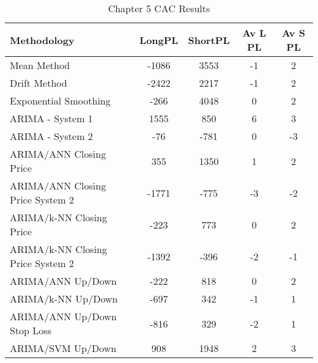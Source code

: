 \begin{table}[ht]
\centering
\caption[Chapter 5 CAC Results]{Chapter 5 CAC Results} 
\label{tab:chp6:cac2_summary}
\begin{tabular}{lcccc}
  \toprule Methodology & LongPL & ShortPL & Av L PL & Av S PL \\ 
  \midrule Mean Method & -1086 & 3553 & -1 & 2 \\ 
  Drift Method & -2422 & 2217 & -1 & 2 \\ 
  Exponential Smoothing & -266 & 4048 & 0 & 2 \\ 
  ARIMA - System 1 & 1555 & 850 & 6 & 3 \\ 
  ARIMA - System 2 & -76 & -781 & 0 & -3 \\ 
  ARIMA/ANN Closing Price & 355 & 1350 & 1 & 2 \\ 
  ARIMA/ANN Closing Price System 2 & -1771 & -775 & -3 & -2 \\ 
  ARIMA/k-NN Closing Price & -223 & 773 & 0 & 2 \\ 
  ARIMA/k-NN Closing Price System 2 & -1392 & -396 & -2 & -1 \\ 
  ARIMA/ANN Up/Down & -222 & 818 & 0 & 2 \\ 
  ARIMA/k-NN Up/Down & -697 & 342 & -1 & 1 \\ 
  ARIMA/ANN Up/Down Stop Loss & -816 & 329 & -2 & 1 \\ 
  ARIMA/SVM Up/Down & 908 & 1948 & 2 & 3 \\ 
   \bottomrule \end{tabular}
\end{table}

